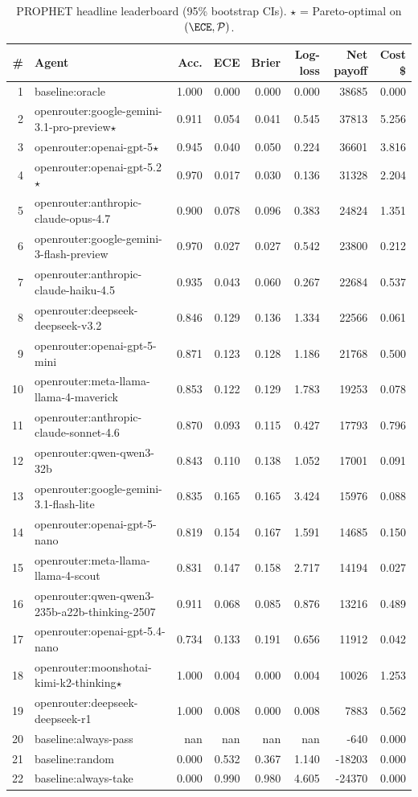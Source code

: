 \begin{table}[t]
\centering\small
\caption{PROPHET headline leaderboard (95\% bootstrap CIs). $\star$ = Pareto-optimal on $(\ECE, \mathcal{P})$.}\label{tab:headline}
\begin{tabular}{rlrrrrrr}
\toprule
\# & Agent & Acc. & ECE & Brier & Log-loss & Net payoff & Cost \$ \\
\midrule
1 & baseline:oracle & 1.000 & 0.000 & 0.000 & 0.000 & 38685 & 0.000 \\
2 & openrouter:google-gemini-3.1-pro-preview$\star$ & 0.911 & 0.054 & 0.041 & 0.545 & 37813 & 5.256 \\
3 & openrouter:openai-gpt-5$\star$ & 0.945 & 0.040 & 0.050 & 0.224 & 36601 & 3.816 \\
4 & openrouter:openai-gpt-5.2$\star$ & 0.970 & 0.017 & 0.030 & 0.136 & 31328 & 2.204 \\
5 & openrouter:anthropic-claude-opus-4.7 & 0.900 & 0.078 & 0.096 & 0.383 & 24824 & 1.351 \\
6 & openrouter:google-gemini-3-flash-preview & 0.970 & 0.027 & 0.027 & 0.542 & 23800 & 0.212 \\
7 & openrouter:anthropic-claude-haiku-4.5 & 0.935 & 0.043 & 0.060 & 0.267 & 22684 & 0.537 \\
8 & openrouter:deepseek-deepseek-v3.2 & 0.846 & 0.129 & 0.136 & 1.334 & 22566 & 0.061 \\
9 & openrouter:openai-gpt-5-mini & 0.871 & 0.123 & 0.128 & 1.186 & 21768 & 0.500 \\
10 & openrouter:meta-llama-llama-4-maverick & 0.853 & 0.122 & 0.129 & 1.783 & 19253 & 0.078 \\
11 & openrouter:anthropic-claude-sonnet-4.6 & 0.870 & 0.093 & 0.115 & 0.427 & 17793 & 0.796 \\
12 & openrouter:qwen-qwen3-32b & 0.843 & 0.110 & 0.138 & 1.052 & 17001 & 0.091 \\
13 & openrouter:google-gemini-3.1-flash-lite & 0.835 & 0.165 & 0.165 & 3.424 & 15976 & 0.088 \\
14 & openrouter:openai-gpt-5-nano & 0.819 & 0.154 & 0.167 & 1.591 & 14685 & 0.150 \\
15 & openrouter:meta-llama-llama-4-scout & 0.831 & 0.147 & 0.158 & 2.717 & 14194 & 0.027 \\
16 & openrouter:qwen-qwen3-235b-a22b-thinking-2507 & 0.911 & 0.068 & 0.085 & 0.876 & 13216 & 0.489 \\
17 & openrouter:openai-gpt-5.4-nano & 0.734 & 0.133 & 0.191 & 0.656 & 11912 & 0.042 \\
18 & openrouter:moonshotai-kimi-k2-thinking$\star$ & 1.000 & 0.004 & 0.000 & 0.004 & 10026 & 1.253 \\
19 & openrouter:deepseek-deepseek-r1 & 1.000 & 0.008 & 0.000 & 0.008 & 7883 & 0.562 \\
20 & baseline:always-pass & nan & nan & nan & nan & -640 & 0.000 \\
21 & baseline:random & 0.000 & 0.532 & 0.367 & 1.140 & -18203 & 0.000 \\
22 & baseline:always-take & 0.000 & 0.990 & 0.980 & 4.605 & -24370 & 0.000 \\
\bottomrule
\end{tabular}
\end{table}